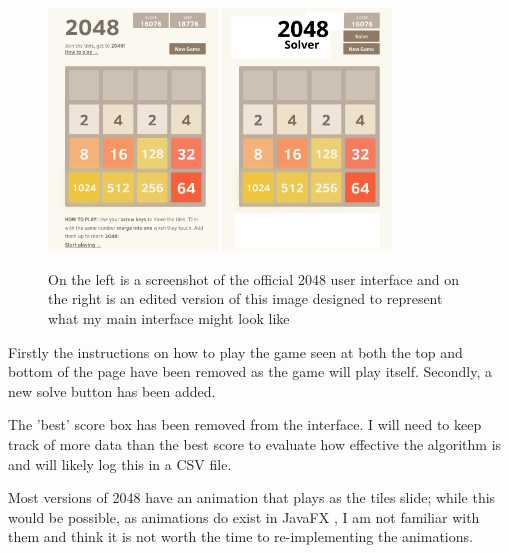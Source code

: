 \documentclass{article}
\begin{document}
\begin{figure}
    \centering
    \includegraphics[width=0.4\textwidth]{2048-interface.png}
    \includegraphics[width=0.4\textwidth]{interface-mockup.png}
    \caption{On the left is a screenshot of the official 2048 user interface \cite{game2048} and on the right
    is an edited version of this image designed to represent what my main interface might look like}
    \label{fig:2048interface}
\end{figure}

Firstly the instructions on how to play the game seen at both the top and bottom of the page have been removed
as the game will play itself. Secondly, a new solve button has been added.

The 'best' score box has been removed from the interface. I will need to keep track of more data than the best score to evaluate how effective the algorithm is and will likely log this in a CSV file.

Most versions of 2048 have an animation that plays as the tiles slide; while this would be possible, as animations do exist in JavaFX \cite{javadocfx}, I am not familiar with them and think it is not worth the time to re-implementing the animations.
\end{document}
